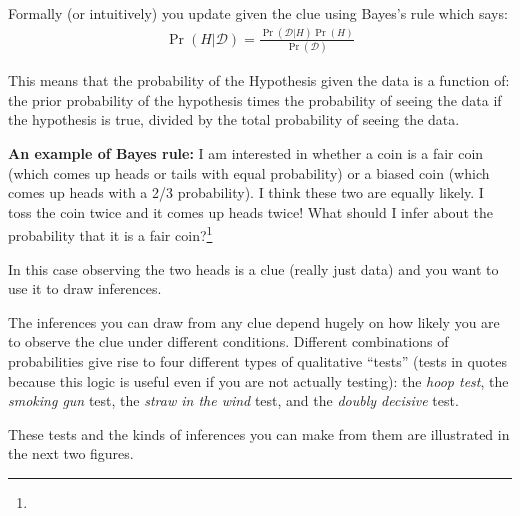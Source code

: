 \documentclass[11pt]{article}
\begin{document}
Formally (or intuitively) you update given the clue using Bayes's rule which says:
\begin{eqnarray}
\Pr(H|\mathcal{D})=\frac{\Pr(\mathcal{D}|H)\Pr(H)}{\Pr(\mathcal{D})}
\end{eqnarray}

This means that the probability of the Hypothesis given the data is a function of: the prior probability of the hypothesis times the probability of seeing the data if the hypothesis is true, divided by the total probability of seeing the data.

\textbf{An example of Bayes rule: }I am interested in whether a coin is a fair coin (which comes up heads or tails with equal probability) or a biased coin (which comes up heads with a 2/3 probability). I think these two are equally likely. I toss the coin twice and it comes up heads twice! What should I infer about the probability that it is a fair coin?\footnote{
}
  
In this case observing the two heads is a clue (really just data) and you want to use it to draw inferences. 

The inferences you can draw from any clue depend hugely on how likely  you are to observe the clue under different conditions. Different combinations of probabilities give rise to four different types of qualitative ``tests'' (tests in quotes because this logic is useful even if you are not actually testing): the \textit{hoop test}, the \textit{smoking gun} test, the \textit{straw in the wind} test, and the \textit{doubly decisive} test. 

These tests and the kinds of inferences you can make from them are illustrated in the next two figures.
\end{document}
